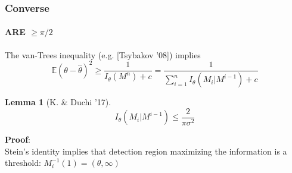 \documentclass[mathserif]{beamer}
\newcommand{\sgn}{\mathsf{sign}}
\newtheorem{lem}{Lemma}
\begin{document}
\begin{frame}
\frametitle{Converse}
\framesubtitle{ARE $\geq \pi/2$}
The van-Trees inequality (e.g. [Tsybakov '08]) implies
\[
\mathbb E \left(\theta - \widehat{\theta} \right)^2 \geq \frac{1}{ I_\theta(M^n) + c} = \frac{1}{\sum_{i=1}^n I_\theta(M_i|M^{i-1}) + c} 
\]
\pause
\begin{lem}[K. \& Duchi '17]
\[
I_\theta(M_i|M^{i-1}) \leq \frac{2}{\pi\sigma^2}
\]
\end{lem}
\pause
\textbf{Proof}: \\
Stein's identity implies that detection region maximizing the information is a threshold: $M_i^{-1}(1) = (\theta,\infty)$ 
\end{frame}

%
\end{document}
